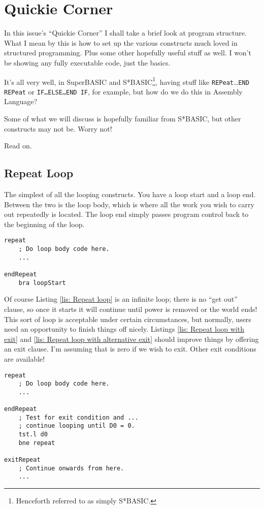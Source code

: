 
\chapter{Quickie Corner}

In this issue's ``Quickie Corner'' I shall take a brief look at program structure. What I mean by this is how to set up the various constructs much loved in structured programming. Plus some other hopefully useful stuff as well. I won't be showing any fully executable code, just the basics.

It's all very well, in SuperBASIC and S*BASIC\footnote{Henceforth referred to as simply S*BASIC.}, having stuff like \texttt{REPeat}\ldots{}\texttt{END REPeat} or \texttt{IF\ldots{}ELSE\ldots{}END IF}, for example, but how do we do this in Assembly Language? 

Some of what we will discuss is hopefully familiar from S*BASIC, but other constructs may not be. Worry not!

Read on.

\section{Repeat Loop}

The simplest of all the looping constructs. You have a loop start and a loop end. Between the two is the loop body, which is where all the work you wish to carry out repeatedly is located. The loop end simply passes program control back to the beginning of the loop.

\begin{lstlisting}[caption={REPEAT \ldots END REPEAT},label={lis: Repeat loop}]
repeat
    ; Do loop body code here.
    ...

endRepeat
    bra loopStart
\end{lstlisting}

Of course Listing \ref{lis: Repeat loop} is an infinite loop; there is no ``get out'' clause, so once it starts it will continue until power is removed or the world ends! This sort of loop is acceptable under certain circumstances, but normally, users need an opportunity to finish things off nicely. Listings \ref{lis: Repeat loop with exit} and \ref{lis: Repeat loop with alternative exit} should improve things by offering an exit clause. I'm assuming that  is zero if we wish to exit. Other exit conditions are available!

\begin{lstlisting}[caption={REPEAT \ldots EXIT \ldots END REPEAT},label={lis: Repeat loop with exit}]
repeat
    ; Do loop body code here.
    ...
    
endRepeat
    ; Test for exit condition and ...
    ; continue looping until D0 = 0.
    tst.l d0   
    bne repeat
    
exitRepeat
    ; Continue onwards from here.
    ...
\end{lstlisting}

